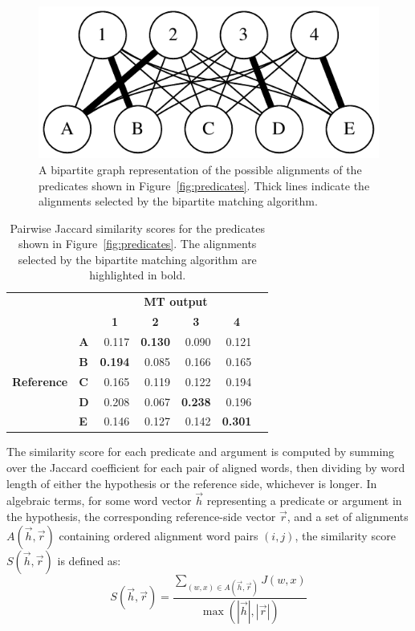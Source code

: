 \documentclass[11pt,twocolumn]{article}
\begin{document}
\begin{figure}
\center
\includegraphics[scale=0.75]{predicate-alignment}
\caption{\label{fig:alignment}
A bipartite graph representation of the possible alignments of the
predicates shown in Figure~\ref{fig:predicates}.
Thick lines indicate the alignments selected by the bipartite matching
algorithm.
}
\end{figure}

\begin{table}
\center
\begin{tabular}{ll|rrrrr}
&
&
\multicolumn{4}{|c}{\textbf{MT output}} \\
&
&
\multicolumn{1}{c}{\textbf{1}} &
\multicolumn{1}{c}{\textbf{2}} &
\multicolumn{1}{c}{\textbf{3}} &
\multicolumn{1}{c}{\textbf{4}} \\
\hline
\multirow{5}{*}{\begin{sideways}\textbf{Reference}\end{sideways}} &
\textbf{A} &
0.117 &
\textbf{0.130} &
0.090 &
0.121 \\
&
\textbf{B} &
\textbf{0.194} &
0.085 &
0.166 &
0.165 \\
&
\textbf{C} &
0.165 &
0.119 &
0.122 &
0.194 \\
&
\textbf{D} &
0.208 &
0.067 &
\textbf{0.238} &
0.196 \\
&
\textbf{E} &
0.146 &
0.127 &
0.142 &
\textbf{0.301}
\end{tabular}
\caption{\label{tab:similarity}
Pairwise Jaccard similarity scores for the predicates shown in
Figure~\ref{fig:predicates}.
The alignments selected by the bipartite matching algorithm are
highlighted in bold.
}
\end{table}

The similarity score for each predicate and argument is computed by
summing over the Jaccard coefficient for each pair of aligned words,
then dividing by word length of either the hypothesis or the reference
side, whichever is longer.
In algebraic terms, for some word vector $\vec h$ representing a
predicate or argument in the hypothesis, the corresponding
reference-side vector $\vec r$, and a set of alignments $A(\vec h, \vec
r)$ containing ordered alignment word pairs $(i,j)$, the similarity
score $S(\vec h, \vec r)$ is defined as:
\[
S(\vec h, \vec r)=\frac{\sum_{(w,x)\in A(\vec h,\vec r)} J(w,x)}
                       {\max(|\vec h|, |\vec r|)}
\]
\end{document}
